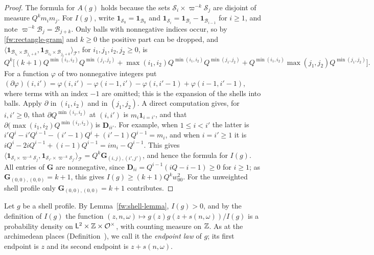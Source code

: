 \begin{proof}
The formula for $A(g)$ holds because the sets
$\mathcal S_i\times\varpi^{-k}\mathcal S_j$ are disjoint of measure
$Q^km_im_j$. For $I(g)$, write $\mathbf 1_{\mathcal S_0}=\mathbf
1_{\mathcal B_0}$ and $\mathbf 1_{\mathcal S_i}=\mathbf 1_{\mathcal
B_i}-\mathbf 1_{\mathcal B_{i-1}}$ for $i\ge1$, and note
$\varpi^{-k}\mathcal B_j=\mathcal B_{j+k}$. Only balls with nonnegative
indices occur, so by \eqref{fw:rectangle-gram} and $k\ge0$ the positive
part can be dropped, and
$\langle\mathbf 1_{\mathcal B_{i_1}\times\mathcal B_{j_1+k}},
\mathbf 1_{\mathcal B_{i_2}\times\mathcal B_{j_2+k}}\rangle_{\mathcal T}$,
for $i_1,j_1,i_2,j_2\ge0$, is
\[
 Q^k\bigl[(k+1)Q^{\min(i_1,i_2)}Q^{\min(j_1,j_2)}
 +\max(i_1,i_2)Q^{\min(i_1,i_2)}Q^{\min(j_1,j_2)}
 +Q^{\min(i_1,i_2)}\max(j_1,j_2)Q^{\min(j_1,j_2)}\bigr].
\]
For a function $\varphi$ of two nonnegative integers put
$(\partial\varphi)(i,i')=\varphi(i,i')-\varphi(i-1,i')-\varphi(i,i'-1)
+\varphi(i-1,i'-1)$, where terms with an index $-1$ are omitted; this is
the expansion of the shells into balls. Apply $\partial$ in
$(i_1,i_2)$ and in $(j_1,j_2)$. A direct computation gives, for
$i,i'\ge0$, that $\partial Q^{\min(i_1,i_2)}$ at $(i,i')$ is
$m_i\mathbf 1_{i=i'}$, and that
$\partial\bigl(\max(i_1,i_2)Q^{\min(i_1,i_2)}\bigr)$ is $\mathbf D_{ii'}$.
For example, when $1\le i<i'$ the latter is
$i'Q^i-i'Q^{i-1}-(i'-1)Q^i+(i'-1)Q^{i-1}=m_i$, and when $i=i'\ge1$ it is
$iQ^i-2iQ^{i-1}+(i-1)Q^{i-1}=im_i-Q^{i-1}$. This gives
$\langle\mathbf 1_{\mathcal S_i\times\varpi^{-k}\mathcal S_j},
\mathbf 1_{\mathcal S_{i'}\times\varpi^{-k}\mathcal S_{j'}}\rangle_{\mathcal T}
=Q^k\mathbf G_{(i,j),(i',j')}$, and hence the formula for $I(g)$.
All entries of $\mathbf G$ are nonnegative, since
$\mathbf D_{ii}=Q^{i-1}(iQ-i-1)\ge0$ for $i\ge1$; as
$\mathbf G_{(0,0),(0,0)}=k+1$, this gives $I(g)\ge(k+1)Q^kw_{00}^2$.
For the unweighted shell profile only $\mathbf G_{(0,0),(0,0)}=k+1$
contributes.
\end{proof}

\begin{definition}\label{fw:endpoint-law}
Let $g$ be a shell profile. By Lemma~\ref{fw:shell-lemma}, $I(g)>0$, and by
the definition of $I(g)$ the function
$(z,n,\omega)\mapsto g(z)g(z+s(n,\omega))/I(g)$ is a probability density on
$\mathsf L^2\times\mathbb Z\times\mathcal O^\times$, with counting measure on $\mathbb Z$.
As at the archimedean places (Definition~), we call it the
\emph{endpoint law} of $g$; its first endpoint is $z$ and its second endpoint
is $z+s(n,\omega)$.
\end{definition}

